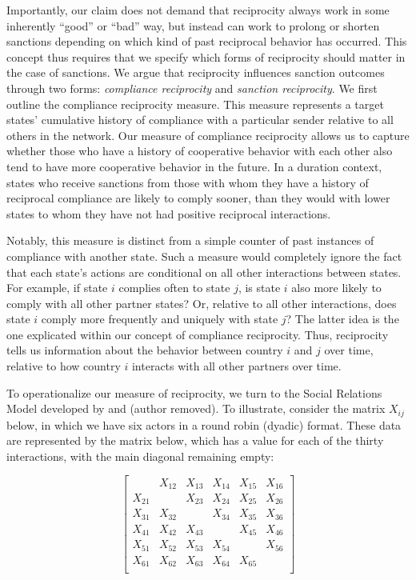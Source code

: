 Importantly, our claim does not demand that reciprocity always work in some inherently ``good'' or ``bad'' way, but instead can work to prolong or shorten sanctions depending on which kind of past reciprocal behavior has occurred. This concept thus requires that we specify which forms of reciprocity should matter in the case of sanctions. We argue that reciprocity influences sanction outcomes through two forms: \textit{compliance reciprocity} and \textit{sanction reciprocity}. We first outline the compliance reciprocity measure. This measure represents a target states' cumulative history of compliance with a particular sender relative to all others in the network. Our measure of compliance reciprocity allows us to capture whether those who have a history of cooperative behavior with each other also tend to have more cooperative behavior in the future. In a duration context, states who receive sanctions from those with whom they have a history of reciprocal compliance are likely to comply sooner, than they would with lower states to whom they have not had positive reciprocal interactions. 

Notably, this measure is distinct from a simple counter of past instances of compliance with another state. Such a measure would completely ignore the fact that each state's actions are conditional on all other interactions between states. For example, if state $i$ complies often to state $j$, is state $i$ also more likely to comply with all other partner states? Or, relative to all other interactions, does state $i$ comply more frequently and uniquely with state $j$? The latter idea is the one explicated within our  concept of compliance reciprocity. Thus, reciprocity tells us information about the behavior between country $i$ and $j$ over time, relative to how country $i$ interacts with all other partners over time. 

To operationalize our measure of reciprocity, we turn to the Social Relations Model developed by \citet{kenny1994interpersonal} and (author removed). To illustrate, consider the matrix $X_{ij}$ below, in which we have six actors in a round robin (dyadic) format. These data are represented by the matrix below, which has a value for each of the thirty interactions, with the main diagonal remaining empty:

\singlespacing
\[
\left[
\begin{array}{cccccc}
 & X_{12}  & X_{13}  & X_{14} & X_{15} & X_{16} \\
X_{21}  &  & X_{23}  & X_{24} & X_{25} & X_{26} \\
X_{31}  & X_{32}  &    & X_{34} & X_{35} & X_{36} \\
X_{41}  & X_{42}  & X_{43}  &  & X_{45} & X_{46} \\
X_{51}  & X_{52}  & X_{53}  & X_{54} &   & X_{56} \\
X_{61}  & X_{62}  & X_{63}  & X_{64} & X_{65} &   \\
\end{array}
\right]
\]

